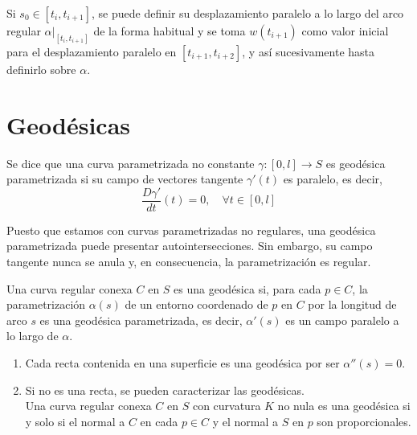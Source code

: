 \begin{note}
    Si $s_0 \in [t_i, t_{i+1}]$, se puede definir su desplazamiento paralelo a lo largo del arco regular $\alpha |_{[t_i, t_{i+1}]}$ de la forma habitual y se toma $w(t_{i+1})$ como valor inicial para el desplazamiento paralelo en $[t_{i+1}, t_{i+2}]$, y así sucesivamente hasta definirlo sobre $\alpha$.
\end{note}

\section{Geodésicas}

\begin{definition}
    Se dice que una curva parametrizada no constante $\gamma : [0, l] \to S$ es geodésica parametrizada si su campo de vectores tangente $\gamma'(t)$ es paralelo, es decir,
    $$\frac{D\gamma'}{dt}(t) = 0, \quad \forall t \in [0, l]$$
\end{definition}

\begin{remark}
    Puesto que estamos con curvas parametrizadas no regulares, una geodésica parametrizada puede presentar autointersecciones.
    Sin embargo, su campo tangente nunca se anula y, en consecuencia, la parametrización es regular.
\end{remark}

\begin{definition}
    Una curva regular conexa $C$ en $S$ es una geodésica si, para cada $p \in C$, la parametrización $\alpha(s)$ de un entorno coordenado de $p$ en $C$ por la longitud de arco $s$ es una geodésica parametrizada, es decir, $\alpha'(s)$ es un campo paralelo a lo largo de $\alpha$.
\end{definition}

\begin{remark}
    \hfill
    \begin{enumerate}
        \item Cada recta contenida en una superficie es una geodésica por ser $\alpha''(s) = 0$.
        \item Si no es una recta, se pueden caracterizar las geodésicas.\\
              Una curva regular conexa $C$ en $S$ con curvatura $K$ no nula es una geodésica si y solo si el normal a $C$ en cada $p \in C$ y el normal a $S$ en $p$ son proporcionales.
    \end{enumerate}
\end{remark}

